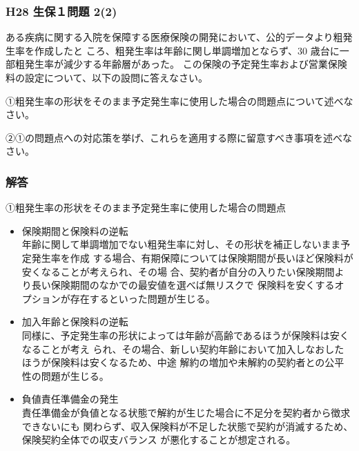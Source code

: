 \documentclass[report,gutter=10mm,fore-edge=10mm,uplatex,dvipdfmx]{jlreq}
\begin{document}
\subsubsection{H28 生保１問題 2(2)}
ある疾病に関する入院を保障する医療保険の開発において、公的データより粗発生率を作成したと
ころ、粗発生率は年齢に関し単調増加とならず、30 歳台に一部粗発生率が減少する年齢層があった。
この保険の予定発生率および営業保険料の設定について、以下の設問に答えなさい。

①粗発生率の形状をそのまま予定発生率に使用した場合の問題点について述べなさい。

②①の問題点への対応策を挙げ、これらを適用する際に留意すべき事項を述べなさい。
\subsubsection{解答}
①粗発生率の形状をそのまま予定発生率に使用した場合の問題点
\begin{itemize}
 \item 保険期間と保険料の逆転\\
年齢に関して単調増加でない粗発生率に対し、その形状を補正しないまま予定発生率を作成
する場合、有期保障については保険期間が長いほど保険料が安くなることが考えられ、その場
合、契約者が自分の入りたい保険期間より長い保険期間のなかでの最安値を選べば無リスクで
保険料を安くするオプションが存在するといった問題が生じる。
 \item 加入年齢と保険料の逆転\\
同様に、予定発生率の形状によっては年齢が高齢であるほうが保険料は安くなることが考え
られ、その場合、新しい契約年齢において加入しなおしたほうが保険料は安くなるため、中途
解約の増加や未解約の契約者との公平性の問題が生じる。
 \item 負値責任準備金の発生\\
責任準備金が負値となる状態で解約が生じた場合に不足分を契約者から徴求できないにも
関わらず、収入保険料が不足した状態で契約が消滅するため、保険契約全体での収支バランス
が悪化することが想定される。
\end{itemize}
\end{document}
